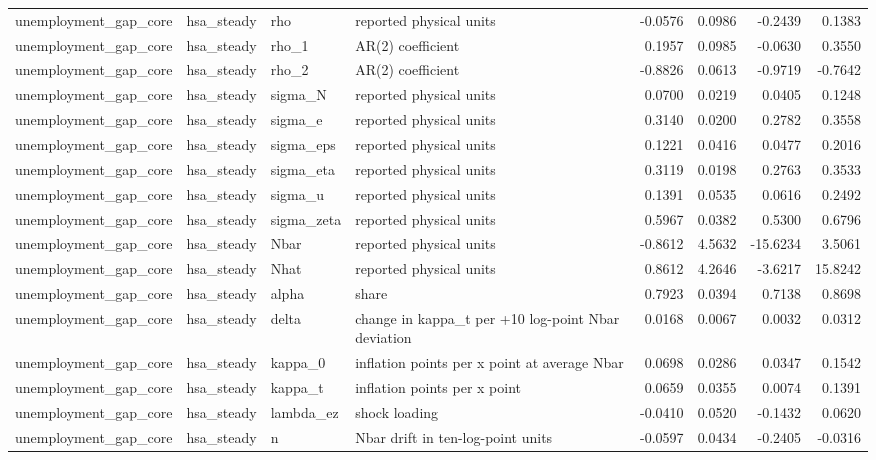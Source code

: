 \begin{tabular}{llllrrrr}
unemployment\_gap\_core & hsa\_steady & rho & reported physical units & -0.0576 & 0.0986 & -0.2439 & 0.1383 \\
unemployment\_gap\_core & hsa\_steady & rho\_1 & AR(2) coefficient & 0.1957 & 0.0985 & -0.0630 & 0.3550 \\
unemployment\_gap\_core & hsa\_steady & rho\_2 & AR(2) coefficient & -0.8826 & 0.0613 & -0.9719 & -0.7642 \\
unemployment\_gap\_core & hsa\_steady & sigma\_N & reported physical units & 0.0700 & 0.0219 & 0.0405 & 0.1248 \\
unemployment\_gap\_core & hsa\_steady & sigma\_e & reported physical units & 0.3140 & 0.0200 & 0.2782 & 0.3558 \\
unemployment\_gap\_core & hsa\_steady & sigma\_eps & reported physical units & 0.1221 & 0.0416 & 0.0477 & 0.2016 \\
unemployment\_gap\_core & hsa\_steady & sigma\_eta & reported physical units & 0.3119 & 0.0198 & 0.2763 & 0.3533 \\
unemployment\_gap\_core & hsa\_steady & sigma\_u & reported physical units & 0.1391 & 0.0535 & 0.0616 & 0.2492 \\
unemployment\_gap\_core & hsa\_steady & sigma\_zeta & reported physical units & 0.5967 & 0.0382 & 0.5300 & 0.6796 \\
unemployment\_gap\_core & hsa\_steady & Nbar & reported physical units & -0.8612 & 4.5632 & -15.6234 & 3.5061 \\
unemployment\_gap\_core & hsa\_steady & Nhat & reported physical units & 0.8612 & 4.2646 & -3.6217 & 15.8242 \\
unemployment\_gap\_core & hsa\_steady & alpha & share & 0.7923 & 0.0394 & 0.7138 & 0.8698 \\
unemployment\_gap\_core & hsa\_steady & delta & change in kappa\_t per +10 log-point Nbar deviation & 0.0168 & 0.0067 & 0.0032 & 0.0312 \\
unemployment\_gap\_core & hsa\_steady & kappa\_0 & inflation points per x point at average Nbar & 0.0698 & 0.0286 & 0.0347 & 0.1542 \\
unemployment\_gap\_core & hsa\_steady & kappa\_t & inflation points per x point & 0.0659 & 0.0355 & 0.0074 & 0.1391 \\
unemployment\_gap\_core & hsa\_steady & lambda\_ez & shock loading & -0.0410 & 0.0520 & -0.1432 & 0.0620 \\
unemployment\_gap\_core & hsa\_steady & n & Nbar drift in ten-log-point units & -0.0597 & 0.0434 & -0.2405 & -0.0316 \\

\end{tabular}
